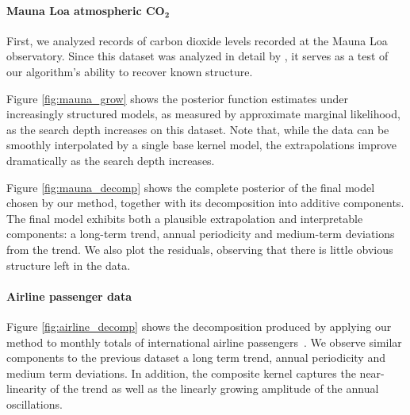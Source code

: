 \documentclass[twoside]{article}
\renewcommand{\fTBD}[1]{}
\begin{document}
\label{sec:extrapolation}
\paragraph{Mauna Loa atmospheric CO$\mathbf{_{2}}$}


First, we analyzed records of carbon dioxide levels recorded at the Mauna Loa observatory.
Since this dataset was analyzed in detail by \citet{rasmussen38gaussian}, it serves as a test of our algorithm's ability to recover known structure.




Figure \ref{fig:mauna_grow} shows the posterior function estimates under increasingly structured models, as measured by approximate marginal likelihood, as the search depth increases on this dataset.
%
%
Note that, while the data can be smoothly interpolated by a single base kernel model, the extrapolations improve dramatically as the search depth increases.


Figure \ref{fig:mauna_decomp} shows the complete posterior of the final model chosen by our method, together with its decomposition into additive components.
The final model exhibits both a plausible extrapolation and interpretable components: a long-term trend, annual periodicity and medium-term deviations from the trend.
We also plot the residuals, observing that there is little obvious structure left in the data.



\paragraph{Airline passenger data}



Figure \ref{fig:airline_decomp} shows the decomposition produced by applying our method to monthly totals of international airline passengers~\citep{box2011time}.
We observe similar components to the previous dataset \ie a long term trend, annual periodicity and medium term deviations.
In addition, the composite kernel captures the near-linearity of the trend as well as the linearly growing amplitude of the annual oscillations.
\end{document}
